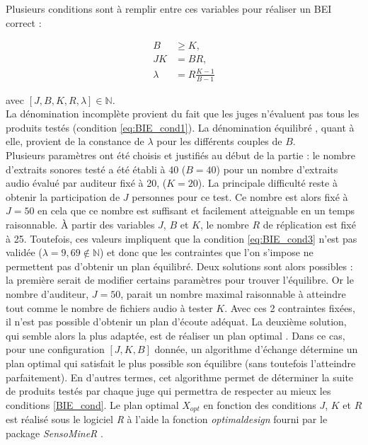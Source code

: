 Plusieurs conditions sont à remplir entre ces variables pour réaliser un BEI correct :

\begin{subequations}\label{BIE_cond}
\begin{align}
B &\geq K, \label{eq:BIE_cond1}\\
JK &= BR, \label{eq:BIE_cond2}\\
\lambda &= R\frac{K-1}{B-1} \label{eq:BIE_cond3}
\end{align}
\end{subequations}

avec $\left[J, B, K, R, \lambda\right] \in \mathbb{N}$.\\

La dénomination \og incomplète \fg{} provient du fait que les juges n'évaluent pas tous les produits testés (condition \ref{eq:BIE_cond1}). La dénomination \og équilibré \fg{}, quant à elle, provient de la constance de $\lambda$ pour les différents couples de $B$. \\

Plusieurs paramètres ont été choisis et justifiés au début de la partie : le nombre d'extraits sonores testé a été établi à 40 ($B = 40$) pour un nombre d'extraits audio évalué par auditeur fixé à 20, ($K = 20$). La principale difficulté reste à obtenir la participation de $J$ personnes pour ce test. Ce nombre est alors fixé à $J = 50$ en cela que ce nombre est suffisant et facilement atteignable en un temps raisonnable. À partir des variables $J$, $B$ et $K$, le nombre $R$ de réplication est fixé à 25. Toutefois, ces valeurs impliquent que la condition \ref{eq:BIE_cond3} n'est pas validée ($\lambda = 9,69 \notin \mathbb{N}$) et donc que les contraintes que l'on s'impose ne permettent pas d'obtenir un plan équilibré. Deux solutions sont alors possibles : la première serait de modifier certains paramètres pour trouver l'équilibre. Or le nombre d'auditeur, $J = 50$, parait un nombre maximal raisonnable à atteindre tout comme le nombre de fichiers audio à tester $K$. Avec ces 2 contraintes fixées, il n'est pas possible d'obtenir un plan d'écoute adéquat. La deuxième solution, qui semble alors la plus adaptée, est de réaliser un plan optimal \cite{pages_blocs_2007}. Dans ce cas, pour une configuration $\left[J, K, B\right]$ donnée, un algorithme d'échange détermine un \og plan optimal \fg{} qui satisfait le plus possible son équilibre (sans toutefois l'atteindre parfaitement). En d'autres termes, cet algorithme permet de déterminer la suite de produits testés par chaque juge qui permettra de respecter au mieux les conditions \ref{BIE_cond}.
Le plan optimal $X_{opt}$ en fonction des conditions $J$, $K$ et $R$ est réalisé sous le logiciel \textit{R} à l'aide la fonction \textit{optimaldesign} fourni par le package \textit{SensoMineR} \cite{le_sensominer_2008}.


